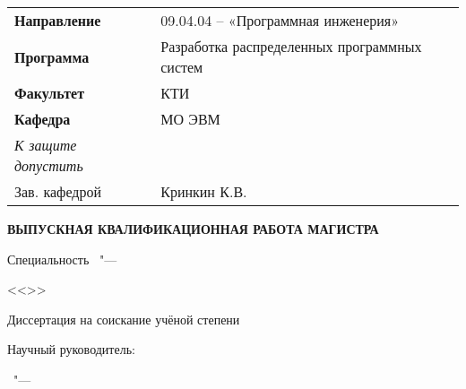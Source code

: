 \thispagestyle{empty}%
\begin{center}%
	\bfseries{
		\fontsize{13pt}{10pt}\selectfont %
		\thesisOrganization
	}
\end{center}%
%
\vspace{-38pt}
%
\begin{center}%
		\begin{tabular}{p{7cm}p{10cm}}
			\textbf{Направление} & 09.04.04 – «Программная инженерия» \\
			\textbf{Программа} & Разработка распределенных программных систем \\ 
			\textbf{Факультет} & КТИ \\ 
			\textbf{Кафедра} & МО ЭВМ \\[8pt] 
			\textit{К защите допустить} &   \\ 
			Зав. кафедрой &  \hspace{4.5cm} Кринкин К.В. \\ 
		\end{tabular}%
\end{center}

\vspace{0pt plus6fill} %
\begin{center}%
	\bfseries{
		\fontsize{18pt}{0pt}\selectfont
		ВЫПУСКНАЯ КВАЛИФИКАЦИОННАЯ РАБОТА МАГИСТРА
	}
	
{\large \thesisAuthor}
\end{center}%
%
\vspace{0pt plus1fill} %
\begin{center}%
\textbf {\large %
\thesisTitle}

\vspace{0pt plus2fill} %
{%
Специальность \thesisSpecialtyNumber\ "---

<<\thesisSpecialtyTitle>>
}

\vspace{0pt plus2fill} %
Диссертация на соискание учёной степени

\thesisDegree
\end{center}%
%
\vspace{0pt plus4fill} %
\begin{flushright}%
Научный руководитель:

\supervisorRegalia

\supervisorFio
\end{flushright}%
%
\vspace{0pt plus4fill} %
\begin{center}%
{\thesisCity\ "--- \thesisYear}
\end{center}%
\newpage
